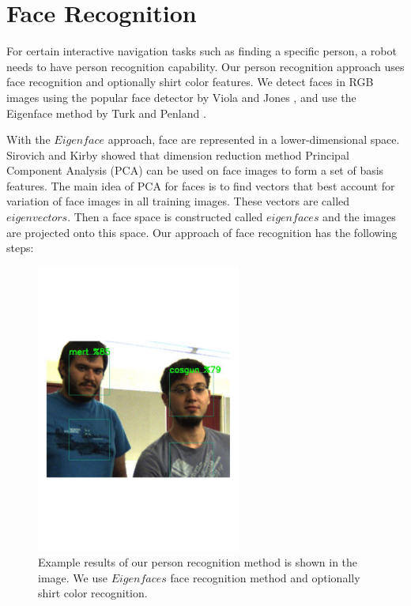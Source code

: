 \section{Face Recognition}
\label{sec:multimodal_face_recognition}

For certain interactive navigation tasks such as finding a specific person, a robot needs to have person recognition capability. Our person recognition approach uses face recognition and optionally shirt color features. We detect faces in RGB images using the popular face detector by Viola and Jones \cite{viola2004robust}, and use the Eigenface method by Turk and Penland \cite{turk1991face}.

With the $Eigenface$ approach, face are represented in a lower-dimensional space. Sirovich and Kirby \cite{sirovich1987low} showed that dimension reduction method Principal Component Analysis (PCA) can be used on face images to form a set of basis features. The main idea of PCA for faces is to find vectors that best account for variation of face images in all training images. These vectors are called $eigenvectors$. Then a face space is constructed called $eigenfaces$ and the images are projected onto this space. Our approach of face recognition has the following steps:

\begin{figure}[ht!]
\centering
\includegraphics[width=0.6\textwidth]{pics/person_recognition}
\caption{Example results of our person recognition method is shown in the image. We use $Eigenfaces$ face recognition method and optionally shirt color recognition.}
\label{fig:person_recognition}
\end{figure}


